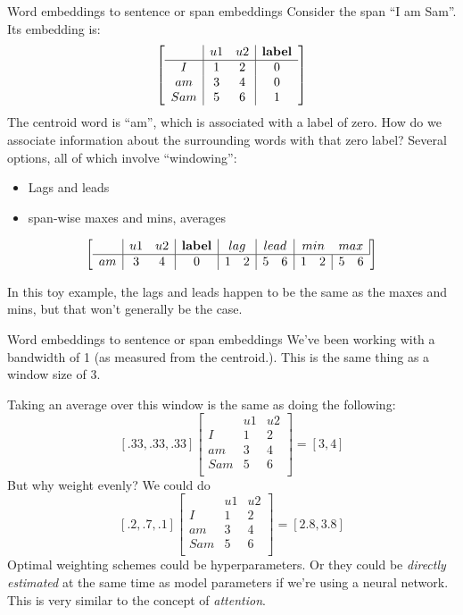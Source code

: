 \documentclass[10pt]{beamer}
\begin{document}
\begin{frame}{Word embeddings to sentence or span embeddings}
Consider the span ``I am Sam''.  Its embedding is:
\[\left[\begin{array}{c|cc|c}
     & u1 & u2 & \text{\textbf{label}}\\
     \hline
I    & 1 & 2 & 0\\
am   & 3 & 4 & 0 \\
Sam  & 5 & 6 & 1  \\
\end{array}\right]\]
The centroid word is ``am'', which is associated with a label of zero.  How do we associate information about the surrounding words with that zero label?  Several options, all of which involve ``windowing'':
\begin{itemize}
\item Lags and leads
\item span-wise maxes and mins, averages
\end{itemize}
\[\left[\begin{array}{c|cc|c|cc|cc|cc|cc}
     & u1 & u2 & \text{\textbf{label}} & \multicolumn{2}{c|}{lag}& \multicolumn{2}{c|}{lead} & \multicolumn{2}{c}{min}& \multicolumn{2}{c|}{max}\\
     \hline
am   & 3 & 4 & 0 &1 &2 & 5 & 6 &1 &2 & 5 & 6\\
\end{array}\right]\]

In this toy example, the lags and leads happen to be the same as the maxes and mins, but that won't generally be the case.
\end{frame}

\begin{frame}{Word embeddings to sentence or span embeddings}
We've been working with a bandwidth of 1 (as measured from the centroid.). This is the same thing as a window size of 3.

Taking an average over this window is the same as doing the following:
\[[.33, .33,  .33]\left[\begin{array}{c|cc}
     & u1 & u2\\
     \hline
I    & 1 & 2\\
am   & 3 & 4\\
Sam  & 5 & 6\\
\end{array}\right]
= [3, 4]
\] 
But why weight evenly?  We could do
\[[.2, .7,  .1]\left[\begin{array}{c|cc}
     & u1 & u2\\
     \hline
I    & 1 & 2\\
am   & 3 & 4\\
Sam  & 5 & 6\\
\end{array}\right]
= [2.8, 3.8]
\] 
Optimal weighting schemes could be hyperparameters.  Or they could be \textit{directly estimated} at the same time as model parameters if we're using a neural network.  This is very similar to the concept of \textit{attention}.
\end{frame}
\end{document}
